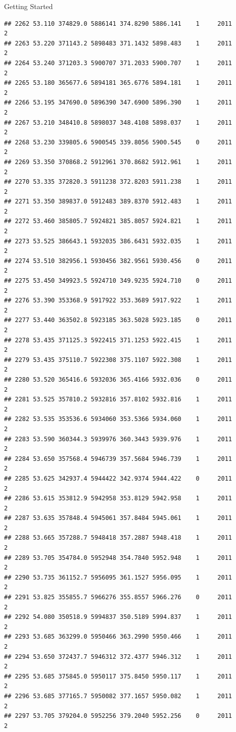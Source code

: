 \documentclass[
  ignorenonframetext,
]{beamer}
\begin{document}
\begin{frame}[fragile]{Getting Started}
\begin{verbatim}
## 2262 53.110 374829.0 5886141 374.8290 5886.141    1     2011        2
## 2263 53.220 371143.2 5898483 371.1432 5898.483    1     2011        2
## 2264 53.240 371203.3 5900707 371.2033 5900.707    1     2011        2
## 2265 53.180 365677.6 5894181 365.6776 5894.181    1     2011        2
## 2266 53.195 347690.0 5896390 347.6900 5896.390    1     2011        2
## 2267 53.210 348410.8 5898037 348.4108 5898.037    1     2011        2
## 2268 53.230 339805.6 5900545 339.8056 5900.545    0     2011        2
## 2269 53.350 370868.2 5912961 370.8682 5912.961    1     2011        2
## 2270 53.335 372820.3 5911238 372.8203 5911.238    1     2011        2
## 2271 53.350 389837.0 5912483 389.8370 5912.483    1     2011        2
## 2272 53.460 385805.7 5924821 385.8057 5924.821    1     2011        2
## 2273 53.525 386643.1 5932035 386.6431 5932.035    1     2011        2
## 2274 53.510 382956.1 5930456 382.9561 5930.456    0     2011        2
## 2275 53.450 349923.5 5924710 349.9235 5924.710    0     2011        2
## 2276 53.390 353368.9 5917922 353.3689 5917.922    1     2011        2
## 2277 53.440 363502.8 5923185 363.5028 5923.185    0     2011        2
## 2278 53.435 371125.3 5922415 371.1253 5922.415    1     2011        2
## 2279 53.435 375110.7 5922308 375.1107 5922.308    1     2011        2
## 2280 53.520 365416.6 5932036 365.4166 5932.036    0     2011        2
## 2281 53.525 357810.2 5932816 357.8102 5932.816    1     2011        2
## 2282 53.535 353536.6 5934060 353.5366 5934.060    1     2011        2
## 2283 53.590 360344.3 5939976 360.3443 5939.976    1     2011        2
## 2284 53.650 357568.4 5946739 357.5684 5946.739    1     2011        2
## 2285 53.625 342937.4 5944422 342.9374 5944.422    0     2011        2
## 2286 53.615 353812.9 5942958 353.8129 5942.958    1     2011        2
## 2287 53.635 357848.4 5945061 357.8484 5945.061    1     2011        2
## 2288 53.665 357288.7 5948418 357.2887 5948.418    1     2011        2
## 2289 53.705 354784.0 5952948 354.7840 5952.948    1     2011        2
## 2290 53.735 361152.7 5956095 361.1527 5956.095    1     2011        2
## 2291 53.825 355855.7 5966276 355.8557 5966.276    0     2011        2
## 2292 54.080 350518.9 5994837 350.5189 5994.837    1     2011        2
## 2293 53.685 363299.0 5950466 363.2990 5950.466    1     2011        2
## 2294 53.650 372437.7 5946312 372.4377 5946.312    1     2011        2
## 2295 53.685 375845.0 5950117 375.8450 5950.117    1     2011        2
## 2296 53.685 377165.7 5950082 377.1657 5950.082    1     2011        2
## 2297 53.705 379204.0 5952256 379.2040 5952.256    0     2011        2

\end{verbatim}
\end{frame}
\end{document}
